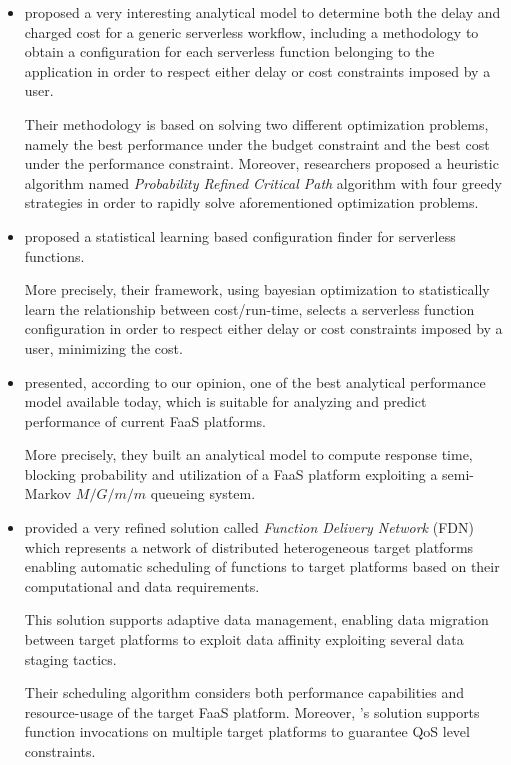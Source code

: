 \documentclass[12pt,a4paper]{report}
\begin{document}
\begin{itemize}
	\item \citet{PMSCP} proposed a very interesting analytical model to determine both the delay and charged cost for a generic serverless workflow, including a methodology to obtain a configuration for each serverless function belonging to the application in order to respect either delay or cost constraints imposed by a user.
	
	Their methodology is based on solving two different optimization problems, namely the best performance under the budget constraint and the best cost under the performance constraint. Moreover, researchers proposed a heuristic algorithm named \textit{Probability Refined Critical Path} algorithm with four greedy strategies in order to rapidly solve aforementioned optimization problems. 
	
	\item \citet{COSE} proposed a statistical learning based configuration finder for serverless functions. 
	
	More precisely, their framework, using bayesian optimization to statistically learn the relationship between cost/run-time, selects a serverless function configuration in order to respect either delay or cost constraints imposed by a user, minimizing the cost.
	
	\item \citet{Modelling} presented, according to our opinion, one of the best analytical performance model available today, which is suitable for analyzing and predict performance of current FaaS platforms. 
	
	More precisely, they built an analytical model to compute response time, blocking probability and utilization of a FaaS platform exploiting a semi-Markov $M/G/m/m$ queueing system.

	\item \citet{NUOVODOCUMENTO} provided a very refined solution called \textit{Function Delivery Network} (FDN) which represents a network of distributed heterogeneous target platforms enabling automatic scheduling of functions to target platforms based on their computational and data requirements. 
	
	This solution supports adaptive data management, enabling data migration between target platforms to exploit data affinity exploiting several data staging tactics.
	
	Their scheduling algorithm considers both performance capabilities and resource-usage of the target FaaS platform. Moreover, \citet{NUOVODOCUMENTO}'s solution supports function invocations on multiple target platforms to guarantee QoS level constraints.
	

\end{itemize}
\end{document}
